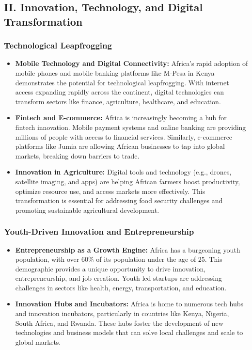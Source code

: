 \documentclass[10pt]{article}
\begin{document}
\subsection*{II. Innovation, Technology, and Digital Transformation}

\subsubsection*{Technological Leapfrogging}
\begin{itemize}
  \item \textbf{Mobile Technology and Digital Connectivity:} Africa's rapid adoption of mobile
    phones and mobile banking platforms like M-Pesa in Kenya demonstrates the
    potential for technological leapfrogging. With internet access expanding rapidly
    across the continent, digital technologies can transform sectors like finance,
    agriculture, healthcare, and education.

  \item \textbf{Fintech and E-commerce:} Africa is increasingly becoming a hub for fintech
    innovation. Mobile payment systems and online banking are providing millions of
    people with access to financial services. Similarly, e-commerce platforms like
    Jumia are allowing African businesses to tap into global markets, breaking down
    barriers to trade.

  \item \textbf{Innovation in Agriculture:} Digital tools and technology (e.g., drones, satellite
    imaging, and apps) are helping African farmers boost productivity, optimize
    resource use, and access markets more effectively. This transformation is
    essential for addressing food security challenges and promoting sustainable
    agricultural development.
\end{itemize}

\subsubsection*{Youth-Driven Innovation and Entrepreneurship}
\begin{itemize}
  \item \textbf{Entrepreneurship as a Growth Engine:} Africa has a burgeoning youth population,
    with over 60\% of its population under the age of 25. This demographic provides a
    unique opportunity to drive innovation, entrepreneurship, and job creation.
    Youth-led startups are addressing challenges in sectors like health, energy,
    transportation, and education.

  \item \textbf{Innovation Hubs and Incubators:} Africa is home to numerous tech hubs and
    innovation incubators, particularly in countries like Kenya, Nigeria, South Africa,
    and Rwanda. These hubs foster the development of new technologies and
    business models that can solve local challenges and scale to global markets.
\end{itemize}
\end{document}
